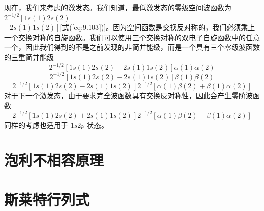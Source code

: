     现在，我们来考虑的激发态。我们知道，最低激发态的零级空间波函数为$2^{-1/2}\left[1s\left(1\right)2s\left(2\right) \right.$\\$\left. - 2s\left(1\right)1s\left(2\right)\right]$[式(\ref{eq:9.103})]。因为空间函数是交换反对称的，我们必须乘上一个交换对称的自旋函数。我们可以使用三个交换对称的双电子自旋函数中的任意一个，因此我们得到的不是之前发现的非简并能级，而是一个具有三个零级波函数的三重简并能级
    \begin{equation}
        2^{-1/2}\left[1s\left(1\right)2s\left(2\right) - 2s\left(1\right)1s\left(2\right)\right]\alpha\left(1\right)\alpha\left(2\right)
        \label{eq:10.27}
    \end{equation}
    \begin{equation}
        2^{-1/2}\left[1s\left(1\right)2s\left(2\right) - 2s\left(1\right)1s\left(2\right)\right]\beta\left(1\right)\beta\left(2\right)
        \label{eq:10.28}
    \end{equation}
    \begin{equation}
        2^{-1/2}\left[1s\left(1\right)2s\left(2\right) - 2s\left(1\right)1s\left(2\right)\right]2^{-1/2}\left[\alpha\left(1\right)\beta\left(2\right) + \beta\left(1\right)\alpha\left(2\right)\right]
        \label{eq:10.29}
    \end{equation}
    对于下一个激发态，由于要求完全波函数具有交换反对称性，因此会产生零阶波函数
    \begin{equation}
        2^{-1/2}\left[1s\left(1\right)2s\left(2\right) + 2s\left(1\right)1s\left(2\right)\right]2^{-1/2}\left[\alpha\left(1\right)\beta\left(2\right) - \beta\left(1\right)\alpha\left(2\right)\right]
        \label{eq:10.30}
    \end{equation}
    同样的考虑也适用于 $1s2p$ 状态。

\section{泡利不相容原理}
\label{sec:10.5 The Pauli Exclusion Principle}























\section{斯莱特行列式}
\label{sec:10.6 Slater Determinants}

